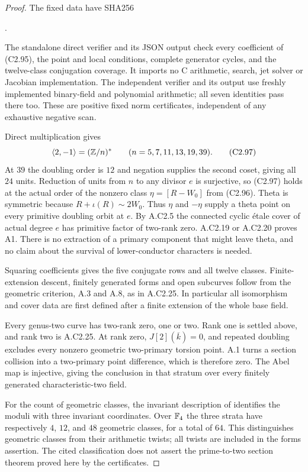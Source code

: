 \begin{proof}
The fixed data have SHA256
\begin{center}
.
\end{center}
The standalone direct verifier
and its JSON output check every coefficient
of (C2.95), the point and local conditions,
complete generator cycles, and the
twelve-class conjugation coverage.
It imports no C arithmetic, search,
jet solver or Jacobian implementation.
The independent verifier
and its output use freshly implemented
binary-field and polynomial arithmetic;
all seven identities pass there too.
These are positive fixed norm certificates,
independent of any exhaustive negative scan.

Direct multiplication gives
\[
                 \langle2,-1\rangle=(\mathbb Z/n)^*
       \qquad(n=5,7,11,13,19,39).                           \tag{C2.97}
\]
At $39$ the doubling order is $12$ and
negation supplies the second coset, giving
all $24$ units. Reduction of units from
$n$ to any divisor $e$ is surjective, so
(C2.97) holds at the actual order of the
nonzero class $\eta=[R-W_0]$ from (C2.96).
Theta is symmetric because
$R+\iota(R)\sim2W_0$. Thus $\eta$ and
$-\eta$ supply a theta point on every
primitive doubling orbit at $e$.
By A.C2.5 the connected cyclic \'etale
cover of actual degree $e$ has primitive
factor of two-rank zero. A.C2.19 or
A.C2.20 proves A1. There is no extraction
of a primary component that might leave
theta, and no claim about the survival
of lower-conductor characters is needed.

Squaring coefficients gives the five
conjugate rows and all twelve classes.
Finite-extension descent, finitely
generated forms and open subcurves follow
from the geometric criterion, A.3 and
A.8, as in A.C2.25. In particular all
isomorphism and cover data are first
defined after a finite extension of
the whole base field.

Every genus-two curve has two-rank
zero, one or two. Rank one is settled
above, and rank two is A.C2.25. At rank
zero, $J[2](\overline k)=0$, and repeated
doubling excludes every nonzero geometric
two-primary torsion point. A.1 turns a
section collision into a two-primary
point difference, which is therefore
zero. The Abel map is injective, giving
the conclusion in that stratum over
every finitely generated characteristic-two
field.

For the count of geometric classes,
the invariant description of
\citet[Theorem 20, author p.~19;
Theorem 22 and Corollary 23, author
p.~21]{A_CardonaNartPujolas2005}
identifies the moduli with three invariant
coordinates. Over $\mathbb F_4$ the three
strata have respectively $4$, $12$, and
$48$ geometric classes, for a total of
$64$. This distinguishes geometric
classes from their arithmetic twists;
all twists are included in the forms
assertion. The cited classification
does not assert the prime-to-two section
theorem proved here by the certificates.


\end{proof}
